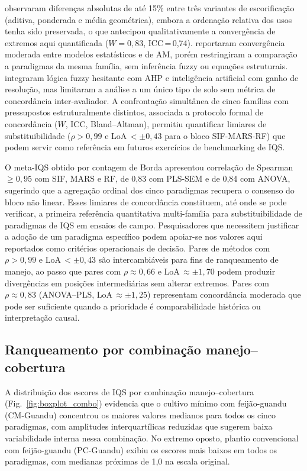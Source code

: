 \documentclass[pdflatex,sn-basic]{sn-jnl}%
\begin{document}
\cite{Mukherjee2014} observaram diferenças absolutas de até 15\% entre três variantes de escorificação (aditiva, ponderada e média geométrica), embora a ordenação relativa dos usos tenha sido preservada, o que antecipou qualitativamente a convergência de extremos aqui quantificada ($W = 0{,}83$, ICC\,=\,0{,}74). \cite{Chaudhry2024} reportaram convergência moderada entre modelos estatísticos e de AM, porém restringiram a comparação a paradigmas da mesma família, sem inferência fuzzy ou equações estruturais. \cite{Pacci2026} integraram lógica fuzzy hesitante com AHP e inteligência artificial com ganho de resolução, mas limitaram a análise a um único tipo de solo sem métrica de concordância inter-avaliador. A confrontação simultânea de cinco famílias com pressupostos estruturalmente distintos, associada a protocolo formal de concordância ($W$, ICC, Bland--Altman), permitiu quantificar limiares de substituibilidade ($\rho > 0{,}99$ e LoA\,$< \pm 0{,}43$ para o bloco SIF-MARS-RF) que podem servir como referência em futuros exercícios de benchmarking de IQS.

O meta-IQS obtido por contagem de Borda apresentou correlação de Spearman $\geq 0{,}95$ com SIF, MARS e RF, de 0,83 com PLS-SEM e de 0,84 com ANOVA, sugerindo que a agregação ordinal dos cinco paradigmas recupera o consenso do bloco não linear. Esses limiares de concordância constituem, até onde se pode verificar, a primeira referência quantitativa multi-família para substituibilidade de paradigmas de IQS em ensaios de campo. Pesquisadores que necessitem justificar a adoção de um paradigma específico podem apoiar-se nos valores aqui reportados como critérios operacionais de decisão. Pares de métodos com $\rho > 0{,}99$ e LoA\,$< \pm 0{,}43$ são intercambiáveis para fins de ranqueamento de manejo, ao passo que pares com $\rho \approx 0{,}66$ e LoA\,$\approx \pm 1{,}70$ podem produzir divergências em posições intermediárias sem alterar extremos. Pares com $\rho \approx 0{,}83$ (ANOVA--PLS, LoA\,$\approx \pm 1{,}25$) representam concordância moderada que pode ser suficiente quando a prioridade é comparabilidade histórica ou interpretação causal.

\subsection{Ranqueamento por combinação manejo--cobertura}\label{subsec:ranking}

A distribuição dos escores de IQS por combinação manejo--cobertura (Fig.~\ref{fig:boxplot_combo}) evidencia que o cultivo mínimo com feijão-guandu (CM-Guandu) concentrou os maiores valores medianos para todos os cinco paradigmas, com amplitudes interquartílicas reduzidas que sugerem baixa variabilidade interna nessa combinação. No extremo oposto, plantio convencional com feijão-guandu (PC-Guandu) exibiu os escores mais baixos em todos os paradigmas, com medianas próximas de 1,0 na escala original.
\end{document}
